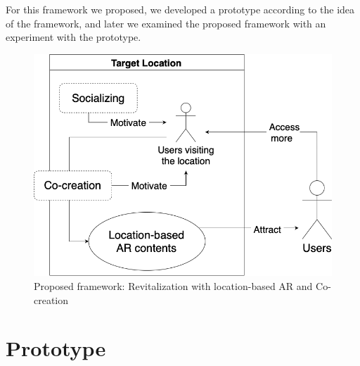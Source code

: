 For this framework we proposed, we developed a prototype according to the idea of the framework, and later we examined the proposed framework with an experiment with the prototype.

\begin{figure}
  \centering
  \includegraphics[width=0.8\columnwidth]{resources/4_methodology/revitalization_with_AR_and_cocreation.png}
    \caption{Proposed framework: Revitalization with location-based AR and Co-creation}
\end{figure}


\section{Prototype}

